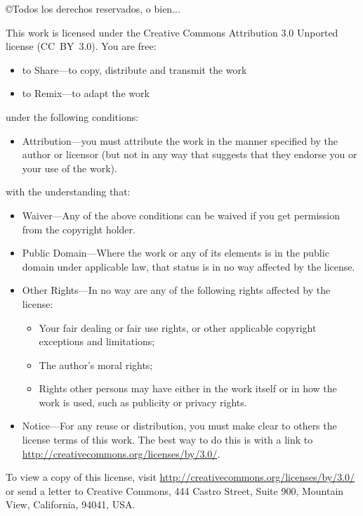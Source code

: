 \documentclass[10pt,a4paper]{book}
\begin{document}
\vspace{0.15cm}
\copyright Todos los derechos reservados, o bien...
%
{\scriptsize 
\noindent
This work is licensed under the Creative Commons Attribution 3.0
Unported license (CC~BY~3.0).  You are free:

\begin{itemize}
  \item to Share---to copy, distribute and transmit the work
  \item to Remix---to adapt the work
\end{itemize}

\noindent
under the following conditions:

\begin{itemize}
  \item Attribution---you must attribute the work in the manner
    specified by the author or licensor (but not in any way that
    suggests that they endorse you or your use of the work).
\end{itemize}

\noindent
with the understanding that:

\begin{itemize}

  \item Waiver---Any of the above conditions can be waived if you get
    permission from the copyright holder.

  \item Public Domain---Where the work or any of its elements is in
    the public domain under applicable law, that status is in no way
    affected by the license.

  \item Other Rights---In no way are any of the following rights
    affected by the license:
    \begin{itemize}

      \item Your fair dealing or fair use rights, or other applicable
        copyright exceptions and limitations;

      \item The author's moral rights;

      \item Rights other persons may have either in the work itself or
        in how the work is used, such as publicity or privacy rights.

    \end{itemize}

  \item Notice---For any reuse or distribution, you must make clear to
    others the license terms of this work. The best way to do this is
    with a link to \url{http://creativecommons.org/licenses/by/3.0/}.

\end{itemize}

\noindent To view a copy of this license, visit
\url{http://creativecommons.org/licenses/by/3.0/} or send a letter to Creative
Commons, 444 Castro Street, Suite 900, Mountain View, California,
94041, USA.\\
}
\end{document}
